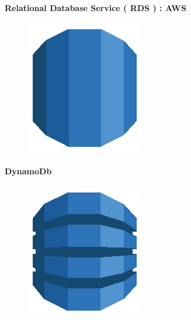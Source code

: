 \documentclass[
12pt,
english,
ngerman,
headsepline,
twoside,
openright,
numbers=noenddot,version=first
]{scrreprt}
\begin{document}
\paragraph{Relational Database Service ( RDS ) : AWS  }
\begin{figure}
	\includegraphics[width=0.9\linewidth]{./pics/aws/Database_AmazonRDS.eps}
\end{figure}


\paragraph{DynamoDb}
\begin{figure}
	\includegraphics[width=0.9\linewidth]{./pics/aws/Database_AmazonDynamoDB.eps}
\end{figure}
\end{document}
